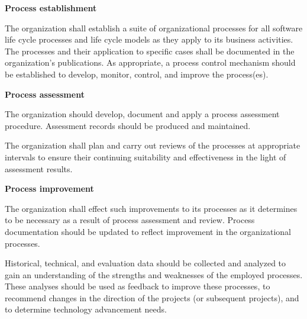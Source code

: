 			\begin{adjustwidth}{2em}{0pt} 

				\begin{compactenum}

					\item {\bf Process establishment}

					\begin{compactenum}

						\item The organization shall establish a suite of organizational processes for all software life cycle processes and life cycle models as they apply to its business activities. The processes and their application to specific cases shall be documented in the organization's publications. As appropriate, a process control mechanism should be established to develop, monitor, control, and improve the process(es).

					\end{compactenum}

					\item {\bf Process assessment}

					\begin{compactenum}

						\item The organization should develop, document and apply a process assessment procedure. Assessment records should be produced and maintained.

						\item The organization shall plan and carry out reviews of the processes at appropriate intervals to ensure their continuing suitability and effectiveness in the light of assessment results.

					\end{compactenum}

					\item {\bf Process improvement}

					\begin{compactenum}

						\item The organization shall effect such improvements to its processes as it determines to be necessary as a result of process assessment and review. Process documentation should be updated to reflect improvement in the organizational processes.
						
						\item Historical, technical, and evaluation data should be collected and analyzed to gain an understanding of the strengths and weaknesses of the employed processes. These analyses should be used as feedback to improve these processes, to recommend changes in the direction of the projects (or subsequent projects), and to determine technology advancement needs.


\end{compactenum}
\end{compactenum}
\end{adjustwidth}
